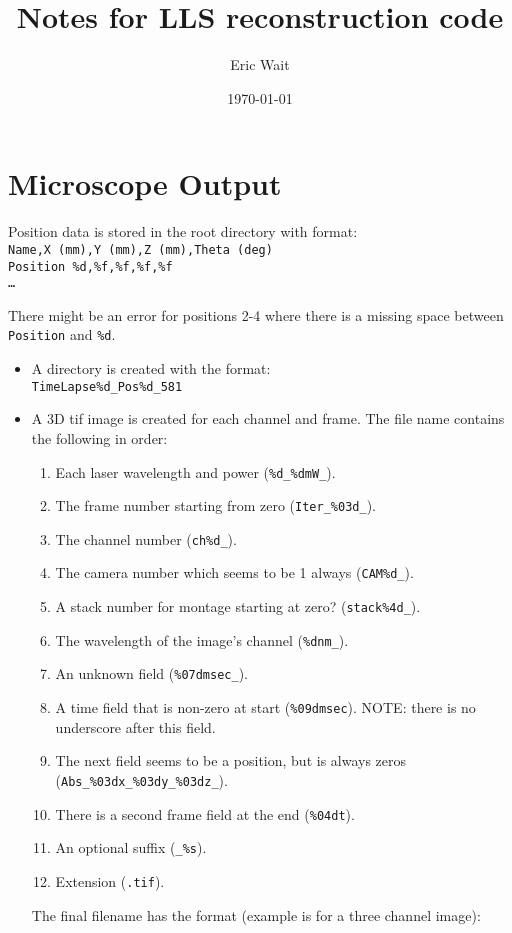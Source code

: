 \documentclass[letter,12pt]{article}
\author{Eric Wait}
\title{Notes for LLS reconstruction code}
\date{\today}
\begin{document}
\maketitle
\listoftodos
\newpage

\section*{Microscope Output}
	Position data is stored in the root directory with format:\\
	\texttt{Name,X (mm),Y (mm),Z (mm),Theta (deg)\\
		Position \%d,\%f,\%f,\%f,\%f\\
		\ldots}

	There might be an error for positions 2-4 where there is a missing space between \texttt{Position} and \texttt{\%d}.
	\begin{itemize}
		\item A directory is created with the format:\\
			\texttt{TimeLapse\%d\_Pos\%d\_581}

		\item A 3D tif image is created for each channel and frame.
			The file name contains the following in order:\\
			\begin{enumerate}
				\item Each laser wavelength and power (\texttt{\%d\_\%dmW\_}).
				\item The frame number starting from zero (\texttt{Iter\_\%03d\_}).
				\item The channel number (\texttt{ch\%d\_}).
				\item The camera number which seems to be 1 always (\texttt{CAM\%d\_}).
				\item A stack number for montage starting at zero? (\texttt{stack\%4d\_}).
				\item The wavelength of the image's channel (\texttt{\%dnm\_}).
				\item An unknown field (\texttt{\%07dmsec\_}).
				\item A time field that is non-zero at start (\texttt{\%09dmsec}).
					NOTE: there is no underscore after this field.
				\item The next field seems to be a position, but is always zeros (\texttt{Abs\_\%03dx\_\%03dy\_\%03dz\_}).
				\item There is a second frame field at the end (\texttt{\%04dt}).
				\item An optional suffix (\texttt{\_\%s}).
				\item Extension (\texttt{.tif}).
			\end{enumerate}
			The final filename has the format (example is for a three channel image):
	\end{itemize}
\end{document}
